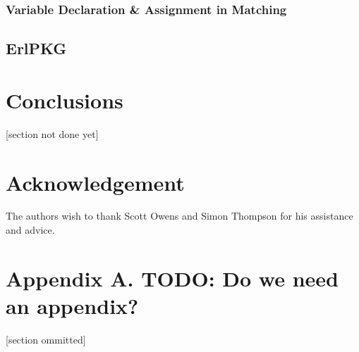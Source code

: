 \documentclass[twoside,12pt,titlepage,a4paper]{article}
\begin{document}
\subsubsection{Variable Declaration \& Assignment in Matching}
\subsection{ErlPKG}

\section{Conclusions}
\label{Conclusions}

 [section not done yet]

\section{Acknowledgement}
The authors wish to thank Scott Owens and Simon Thompson for his assistance and advice.

\appendix
\section*{Appendix A. TODO: Do we need an appendix?}


[section ommitted]



\vskip 0.2in


\end{document}
